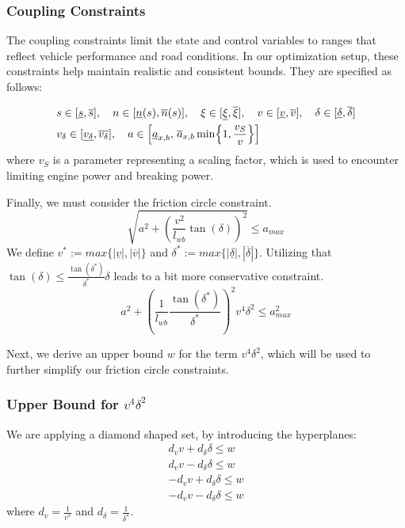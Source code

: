 \subsubsection{Coupling Constraints} \label{sec:kst_coupling_constraints}
The coupling constraints limit the state and control variables to ranges that reflect vehicle performance and road conditions.
In our optimization setup, these constraints help maintain realistic and consistent bounds.
They are specified as follows:

\begin{align}
	 & s \in [\underline{s}, \overline{s}], \quad n \in [\underline{n}(s), \overline{n}(s)], \quad \xi
	\in [\underline{\xi}, \overline{\xi}], \quad v \in [\underline{v}, \overline{v}], \quad \delta \in [\underline{\delta}, \overline{\delta}] \label{eq:coupling_kst_0} \\
	 & v_\delta \in [\underline{v_\delta}, \overline{v_\delta}], \quad a \in \Bigl[\underline{a}_{x,b},\, \overline{a}_{x,b}\min\Bigl\{1,
		\frac{v_S}{v}\Bigr\}\Bigr] \label{eq:coupling_kst_1}
\end{align}
where $ v_S $ is a parameter representing a scaling factor, which is used to encounter limiting engine power and
breaking power.

Finally, we must consider the friction circle constraint.
\begin{equation}
	\sqrt{a^2 + (\frac{v^2}{l_{wb}} \tan(\delta))^2} \leq a_{max}
	\label{eq:friction_circle}
\end{equation}
We define $v^* := max\{|\underline{v}|, |\overline{v}|\}$ and $\delta^* := max\{|\underline{\delta}|, |\overline{\delta}|\}$.
Utilizing that $\tan(\delta) \leq \frac{\tan(\delta^*)}{\delta^*}\delta$ leads to a bit more conservative constraint.
\begin{equation}
	a^2 + (\frac{1}{l_{wb}}\frac{\tan(\delta^*)}{\delta^*})^2 v^4 \delta^2 \leq a_{max}^2
	\label{eq:friction_circle_stricter}
\end{equation}

Next, we derive an upper bound $w$ for the term $v^4 \delta^2$, which will be used to further simplify our friction circle constraints.

\subsubsection{Upper Bound for $v^4 \delta^2$}

We are applying a diamond shaped set, by introducing the hyperplanes:
\begin{align}
	d_v  v + d_\delta  \delta \leq w \label{eq:first_hyperplane} \\
	d_v  v - d_\delta  \delta \leq w                             \\
	-d_v v + d_\delta \delta  \leq w                             \\
	-d_v v - d_\delta \delta  \leq w \label{eq:last_hyperplane}
\end{align}
where $d_v = \frac{1}{v^*}$ and $d_\delta = \frac{1}{\delta^*}$.

